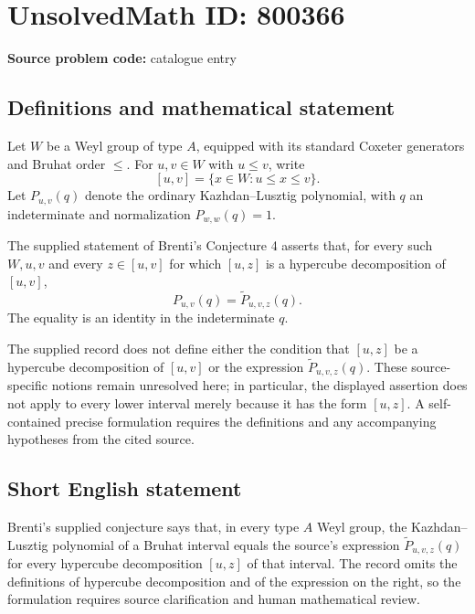 \documentclass[11pt]{article}
\begin{document}
\section*{UnsolvedMath ID: 800366}
\textbf{Source problem code:} catalogue entry
\subsection{Definitions and mathematical statement}
Let \(W\) be a Weyl group of type \(A\), equipped with its standard Coxeter generators and Bruhat order \(\leq\). For \(u,v\in W\) with \(u\leq v\), write
\[
[u,v]=\{x\in W:u\leq x\leq v\}.
\]
Let \(P_{u,v}(q)\) denote the ordinary Kazhdan--Lusztig polynomial, with \(q\) an indeterminate and normalization \(P_{w,w}(q)=1\).

The supplied statement of Brenti's Conjecture 4 asserts that, for every such \(W,u,v\) and every \(z\in[u,v]\) for which \([u,z]\) is a hypercube decomposition of \([u,v]\),
\[
P_{u,v}(q)=\widetilde{P}_{u,v,z}(q).
\]
The equality is an identity in the indeterminate \(q\).

The supplied record does not define either the condition that \([u,z]\) be a hypercube decomposition of \([u,v]\) or the expression \(\widetilde{P}_{u,v,z}(q)\). These source-specific notions remain unresolved here; in particular, the displayed assertion does not apply to every lower interval merely because it has the form \([u,z]\). A self-contained precise formulation requires the definitions and any accompanying hypotheses from the cited source.
\subsection{Short English statement}
Brenti's supplied conjecture says that, in every type \(A\) Weyl group, the Kazhdan--Lusztig polynomial of a Bruhat interval equals the source's expression \(\widetilde{P}_{u,v,z}(q)\) for every hypercube decomposition \([u,z]\) of that interval. The record omits the definitions of hypercube decomposition and of the expression on the right, so the formulation requires source clarification and human mathematical review.
\end{document}

